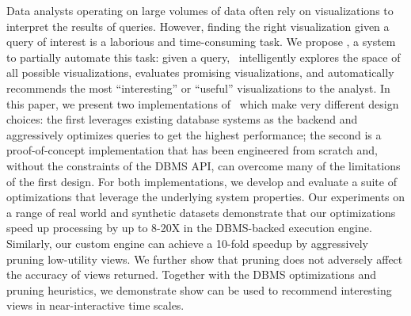 

Data analysts operating on large volumes of data often rely on visualizations to
interpret the results of queries.
However, finding the right visualization given a query of interest is a
laborious and time-consuming task.
We propose \VizRecDB, a system to partially automate this task:
given a query, \VizRecDB\ intelligently explores the space of all possible
visualizations, evaluates promising visualizations, and automatically recommends
the most ``interesting'' or ``useful'' visualizations to the analyst.
In this paper, we present two implementations of \VizRecDB\ which make very
different design choices: the first leverages existing database systems as the
backend and aggressively optimizes queries to get the highest performance; the
second is a proof-of-concept implementation that has been engineered from
scratch and, without the constraints of the DBMS API, can overcome many of the
limitations of the first design.
For both implementations, we develop and evaluate a suite of optimizations that
leverage the underlying system properties.
Our experiments  on a range of real world and synthetic datasets demonstrate
that our optimizations speed up processing by up to 8-20X in the DBMS-backed
execution engine.
Similarly, our custom engine can achieve a 10-fold speedup by aggressively
pruning low-utility views. We further show that pruning does not adversely
affect the accuracy of views returned.
Together with the DBMS optimizations and pruning heuristics, we demonstrate show
\VizRecDB can be used to recommend interesting views in near-interactive time
scales.
